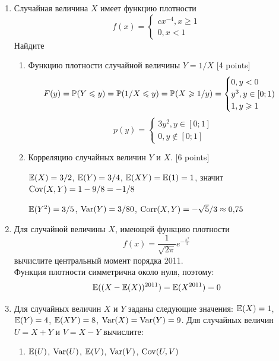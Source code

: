 \documentclass[12pt, a4paper]{article}\usepackage[]{graphicx}\usepackage[]{color}
\begin{document}
\begin{enumerate}
\item Случайная величина $X$ имеет функцию плотности
\begin{equation}
f(x)=
\begin{cases}
    cx^{-4}, x\geq 1 \\
    0, x<1
\end{cases}
\end{equation}
Найдите
\begin{enumerate}
\item  Функцию плотности случайной величины $Y=1/X$ [4 points]
\begin{equation}
F(y)=\P(Y\leq y)=\P(1/X \leq y)=\P(X\geq 1/y)=
\begin{cases}
0, y<0 \\
y^3, y\in [0;1) \\
1, y \geq 1
\end{cases}
\end{equation}
\begin{equation}
p(y)=
\begin{cases}
3y^2, y\in [0;1]\\
0, y\notin [0;1]
\end{cases}
\end{equation}


\item  Корреляцию случайных величин $Y$ и $X$. [6 points]


$\E(X)=3/2$, $\E(Y)=3/4$, $\E(XY)=\E(1)=1$, значит $\Cov(X,Y)=1-9/8=-1/8$

$\E(Y^2)=3/5$, $\Var(Y)=3/80$, $\Corr(X,Y)=-\sqrt{5}/3\approx 0{,}75$
\end{enumerate}

\item Для случайной величины $X$, имеющей функцию плотности
\begin{equation}
f(x)=\frac{1}{\sqrt{2\pi}}e^{-\frac{x^2}{2}}
\end{equation}
вычислите центральный момент порядка 2011.\\
Функция плотности симметрична около нуля, поэтому:
\begin{equation}
\E((X-\E(X))^{2011})=\E(X^{2011})=0
\end{equation}


\item Для случайных величин $X$ и $Y$ заданы следующие значения: $\E(X)=1$, $\E(Y)=4$, $\E(XY)=8$, $\Var(X)=\Var(Y)=9$. Для случайных величин $U=X+Y$ и $V=X-Y$ вычислите:
\begin{enumerate}
\item $\E(U)$, $\Var(U)$, $\E(V)$, $\Var(V)$, $\Cov(U,V)$ \\


\end{enumerate}
\end{enumerate}
\end{document}
